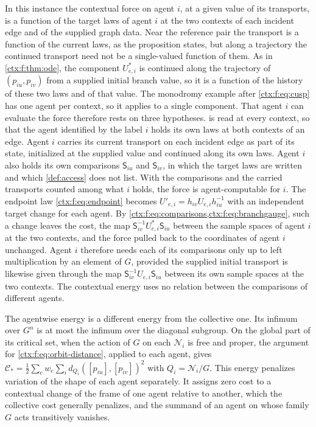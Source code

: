 In this instance the contextual force on agent $i$, at a given value of its transports, is a function of the target laws of agent $i$ at the two contexts of each incident edge and of the supplied graph data. Near the reference pair the transport is a function of the current laws, as the proposition states, but along a trajectory the continued transport need not be a single-valued function of them. As in \cref{ctx:f:thm:ode}, the component $U^*_{e,i}$ is continued along the trajectory of $(p_{iu},p_{iv})$ from a supplied initial branch value, so it is a function of the history of these two laws and of that value. The monodromy example after \cref{ctx:f:eq:cusp} has one agent per context, so it applies to a single component. That agent $i$ can evaluate the force therefore rests on three hypotheses.  is read at every context, so that the agent identified by the label $i$ holds its own laws at both contexts of an edge. Agent $i$ carries its current transport on each incident edge as part of its state, initialized at the supplied value and continued along its own laws. Agent $i$ also holds its own comparisons $\mathsf S_{iu}$ and $\mathsf S_{iv}$, in which the target laws are written and which \cref{def:access} does not list. With the comparisons and the carried transports counted among what $i$ holds, the force is agent-computable for $i$. The endpoint law \cref{ctx:f:eq:endpoint} becomes $U'_{e,i}=h_{iv}U_{e,i}h_{iu}^{-1}$ with an independent target change for each agent. By \cref{ctx:f:eq:comparisons,ctx:f:eq:branchgauge}, such a change leaves the cost, the map $\mathsf S_{iv}^{-1}U^*_{e,i}\mathsf S_{iu}$ between the sample spaces of agent $i$ at the two contexts, and the force pulled back to the coordinates of agent $i$ unchanged. Agent $i$ therefore needs each of its comparisons only up to left multiplication by an element of $G$, provided the supplied initial transport is likewise given through the map $\mathsf S_{iv}^{-1}U_{e,i}\mathsf S_{iu}$ between its own sample spaces at the two contexts. The contextual energy uses no relation between the comparisons of different agents.

The agentwise energy is a different energy from the collective one. Its infimum over $G^n$ is at most the infimum over the diagonal subgroup. On the global part of its critical set, when the action of $G$ on each $\mathcal N_i$ is free and proper, the argument for \cref{ctx:f:eq:orbit-distance}, applied to each agent, gives $\mathcal C_*=\tfrac12\sum_ew_e\sum_id_{Q_i}([p_{iu}],[p_{iv}])^2$ with $Q_i=\mathcal N_i/G$. This energy penalizes variation of the shape of each agent separately. It assigns zero cost to a contextual change of the frame of one agent relative to another, which the collective cost generally penalizes, and the summand of an agent on whose family $G$ acts transitively vanishes.

